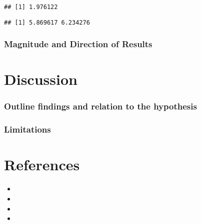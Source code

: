\documentclass[
]{article}
\providecommand{\tightlist}{%
  \setlength{\itemsep}{0pt}\setlength{\parskip}{0pt}}
\begin{document}
\begin{verbatim}
## [1] 1.976122
\end{verbatim}

\begin{verbatim}
## [1] 5.869617 6.234276
\end{verbatim}

\hypertarget{magnitude-and-direction-of-results}{%
\subsubsection{\texorpdfstring{\textbf{Magnitude and Direction of
Results}}{Magnitude and Direction of Results}}\label{magnitude-and-direction-of-results}}

\hypertarget{discussion-1}{%
\section{Discussion}\label{discussion-1}}

\hypertarget{outline-findings-and-relation-to-the-hypothesis}{%
\subsubsection{\texorpdfstring{\textbf{Outline findings and relation to
the
hypothesis}}{Outline findings and relation to the hypothesis}}\label{outline-findings-and-relation-to-the-hypothesis}}

\hypertarget{limitations}{%
\subsubsection{\texorpdfstring{\textbf{Limitations}}{Limitations}}\label{limitations}}

\hypertarget{references}{%
\section{References}\label{references}}

\begin{itemize}
\tightlist
\item
\item
\item
\item
\end{itemize}
\end{document}
